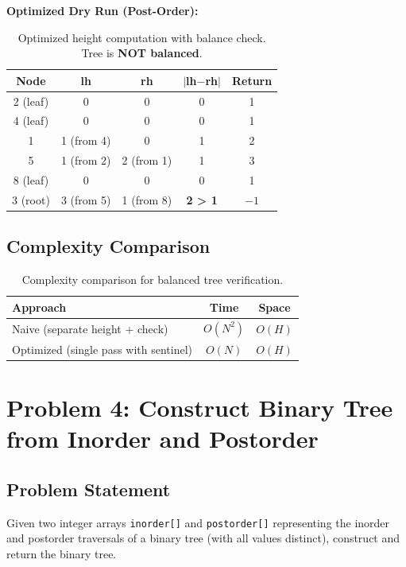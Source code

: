 \documentclass[10pt,journal,compsoc,onecolumn]{IEEEtran}
\begin{document}
\textbf{Optimized Dry Run (Post-Order):}

\begin{table}[htbp]
\centering
\begin{tabular}{|c|c|c|c|c|}
\hline
\textbf{Node} & \textbf{lh} & \textbf{rh} & \textbf{$|$lh$-$rh$|$} & \textbf{Return} \\
\hline
2 (leaf) & 0 & 0 & 0 & 1 \\
4 (leaf) & 0 & 0 & 0 & 1 \\
1 & 1 (from 4) & 0 & 1 & 2 \\
5 & 1 (from 2) & 2 (from 1) & 1 & 3 \\
8 (leaf) & 0 & 0 & 0 & 1 \\
3 (root) & 3 (from 5) & 1 (from 8) & \textbf{2 > 1} & \textbf{$-1$} \\
\hline
\end{tabular}
\caption{Optimized height computation with balance check. Tree is \textbf{NOT balanced}.}
\end{table}

\subsection{Complexity Comparison}

\begin{table}[htbp]
\centering
\begin{tabular}{|l|c|c|}
\hline
\textbf{Approach} & \textbf{Time} & \textbf{Space} \\
\hline
Naive (separate height + check) & $O(N^2)$ & $O(H)$ \\
Optimized (single pass with sentinel) & $O(N)$ & $O(H)$ \\
\hline
\end{tabular}
\caption{Complexity comparison for balanced tree verification.}
\end{table}

\section{Problem 4: Construct Binary Tree from Inorder and Postorder}
\label{sec:construct}

\subsection{Problem Statement}

Given two integer arrays \texttt{inorder[]} and \texttt{postorder[]} representing the inorder and postorder traversals of a binary tree (with all values distinct), construct and return the binary tree.
\end{document}
